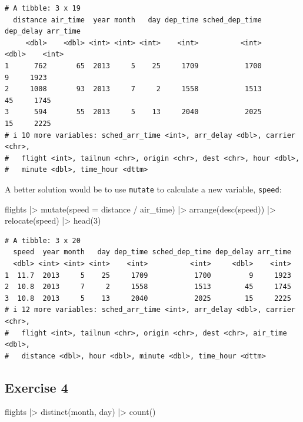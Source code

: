 \documentclass[
  letterpaper,
  DIV=11,
  numbers=noendperiod]{scrreprt}
\newenvironment{Shaded}{\begin{snugshade}}{\end{snugshade}}
\newcommand{\AttributeTok}[1]{\textcolor[rgb]{0.40,0.45,0.13}{#1}}
\newcommand{\DecValTok}[1]{\textcolor[rgb]{0.68,0.00,0.00}{#1}}
\newcommand{\FunctionTok}[1]{\textcolor[rgb]{0.28,0.35,0.67}{#1}}
\newcommand{\NormalTok}[1]{\textcolor[rgb]{0.00,0.23,0.31}{#1}}
\newcommand{\SpecialCharTok}[1]{\textcolor[rgb]{0.37,0.37,0.37}{#1}}
\begin{document}
\begin{verbatim}
# A tibble: 3 x 19
  distance air_time  year month   day dep_time sched_dep_time dep_delay arr_time
     <dbl>    <dbl> <int> <int> <int>    <int>          <int>     <dbl>    <int>
1      762       65  2013     5    25     1709           1700         9     1923
2     1008       93  2013     7     2     1558           1513        45     1745
3      594       55  2013     5    13     2040           2025        15     2225
# i 10 more variables: sched_arr_time <int>, arr_delay <dbl>, carrier <chr>,
#   flight <int>, tailnum <chr>, origin <chr>, dest <chr>, hour <dbl>,
#   minute <dbl>, time_hour <dttm>
\end{verbatim}

A better solution would be to use \texttt{mutate} to calculate a new
variable, \texttt{speed}:

\begin{Shaded}
\begin{Highlighting}[]
\NormalTok{flights }\SpecialCharTok{|\textgreater{}}
  \FunctionTok{mutate}\NormalTok{(}\AttributeTok{speed =}\NormalTok{ distance }\SpecialCharTok{/}\NormalTok{ air\_time) }\SpecialCharTok{|\textgreater{}}
  \FunctionTok{arrange}\NormalTok{(}\FunctionTok{desc}\NormalTok{(speed)) }\SpecialCharTok{|\textgreater{}}
  \FunctionTok{relocate}\NormalTok{(speed) }\SpecialCharTok{|\textgreater{}}
  \FunctionTok{head}\NormalTok{(}\DecValTok{3}\NormalTok{)}
\end{Highlighting}
\end{Shaded}

\begin{verbatim}
# A tibble: 3 x 20
  speed  year month   day dep_time sched_dep_time dep_delay arr_time
  <dbl> <int> <int> <int>    <int>          <int>     <dbl>    <int>
1  11.7  2013     5    25     1709           1700         9     1923
2  10.8  2013     7     2     1558           1513        45     1745
3  10.8  2013     5    13     2040           2025        15     2225
# i 12 more variables: sched_arr_time <int>, arr_delay <dbl>, carrier <chr>,
#   flight <int>, tailnum <chr>, origin <chr>, dest <chr>, air_time <dbl>,
#   distance <dbl>, hour <dbl>, minute <dbl>, time_hour <dttm>
\end{verbatim}

\subsection{Exercise 4}\label{exercise-4-6}

\begin{Shaded}
\begin{Highlighting}[]
\NormalTok{flights }\SpecialCharTok{|\textgreater{}}
  \FunctionTok{distinct}\NormalTok{(month, day) }\SpecialCharTok{|\textgreater{}}
  \FunctionTok{count}\NormalTok{()}
\end{Highlighting}
\end{Shaded}
\end{document}
